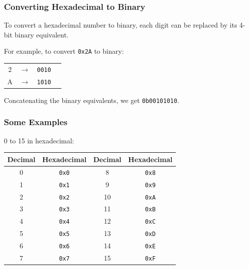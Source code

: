 \documentclass{beamer}
\begin{document}
\begin{frame}
\frametitle{Converting Hexadecimal to Binary}
To convert a hexadecimal number to binary, each digit can be replaced by its 4-bit binary equivalent.

\vspace{0.5cm}

For example, to convert \texttt{0x2A} to binary:

\vspace{0.5cm}

\begin{tabular}{c c c c}
2 & $\rightarrow$ & \texttt{0010} & \\
A & $\rightarrow$ & \texttt{1010} & \\
\end{tabular}

\vspace{0.5cm}

Concatenating the binary equivalents, we get \texttt{0b00101010}.
\end{frame}
\begin{frame}
\frametitle{Some Examples}
0 to 15 in hexadecimal:
\begin{center}
\begin{tabular}{ | c | c | c | c | }
\hline
Decimal & Hexadecimal & Decimal & Hexadecimal \\ \hline
0 & \texttt{0x0} & 8 & \texttt{0x8} \\ \hline
1 & \texttt{0x1} & 9 & \texttt{0x9} \\ \hline
2 & \texttt{0x2} & 10 & \texttt{0xA} \\ \hline
3 & \texttt{0x3} & 11 & \texttt{0xB} \\ \hline
4 & \texttt{0x4} & 12 & \texttt{0xC} \\ \hline
5 & \texttt{0x5} & 13 & \texttt{0xD} \\ \hline
6 & \texttt{0x6} & 14 & \texttt{0xE} \\ \hline
7 & \texttt{0x7} & 15 & \texttt{0xF} \\ \hline
\end{tabular}
\end{center}
\end{frame}


\label{sec:how_do_computers_work}
\end{document}
